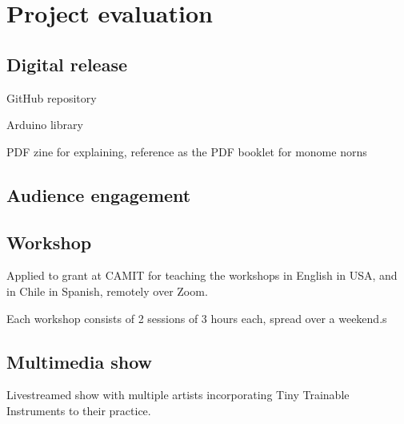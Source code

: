 \chapter{Project evaluation}

\section{Digital release}

GitHub repository

Arduino library


PDF zine for explaining, reference as the PDF booklet for monome norns

\section{Audience engagement}


\section{Workshop}


Applied to grant at CAMIT for teaching the workshops in English in USA, and in Chile in Spanish, remotely over Zoom.

Each workshop consists of 2 sessions of 3 hours each, spread over a weekend.s

\section{Multimedia show}

Livestreamed show with multiple artists incorporating Tiny Trainable Instruments to their practice.
